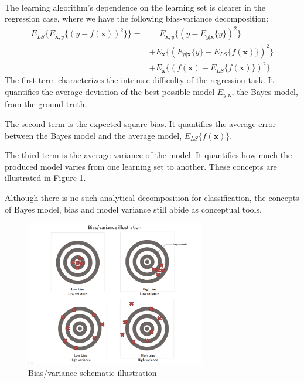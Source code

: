 \documentclass[a4paper]{report}
\begin{document}
\paragraph{}
The learning algorithm's dependence on the learning set is clearer in the regression case, where we have the following bias-variance decomposition: 
\begin{align*}
	E_{LS} \{ E_{\boldsymbol{x},y} \{ (y - f(\boldsymbol{x}))^2\} \} = &\phantom{+} E_{\boldsymbol{x},y} \{ (y - E_{y|\boldsymbol{x}}\{ y\})^2 \}  \\
	                                                                   &+ E_{\boldsymbol{x}} \{ (E_{y|\boldsymbol{x}}\{ y\} - E_{LS}\{f(\boldsymbol{x})\})^2 \}  \\
																																	   &+ E_{\boldsymbol{x}} \{ (f(\boldsymbol{x}) -  E_{LS}\{f(\boldsymbol{x})\})^2 \}
\end{align*}
The first term characterizes the intrinsic difficulty of the regression task. It quantifies the average deviation of the best possible model $E_{y|\boldsymbol{x}}$, the Bayes model, from the ground truth.
\par
The second term is the expected square bias. It quantifies the average error between the Bayes model and the average model, $E_{LS}\{f(\boldsymbol{x})\}$. 
\par
The third term is the average variance of the model. It quantifies how much the produced model varies from one learning set to another. These concepts are illustrated in Figure \ref{fig:BiasVariance}.
\par
Although there is no such analytical decomposition for classification, the concepts of Bayes model, bias and model variance still abide as conceptual tools.
\begin{figure}
	\centering
		\includegraphics[width=0.7\textwidth]{images/BiasVariance.png}
	\caption{\label{fig:BiasVariance}Bias/variance schematic illustration}
\end{figure}
\end{document}
